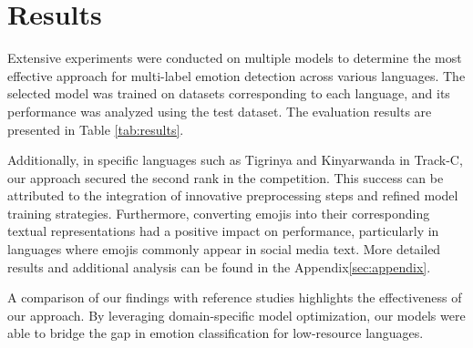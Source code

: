 \section{Results}
Extensive experiments were conducted on multiple models to determine the most effective approach for multi-label emotion detection across various languages. The selected model was trained on datasets corresponding to each language, and its performance was analyzed using the test dataset. The evaluation results are presented in Table \ref{tab:results}.

Additionally, in specific languages such as Tigrinya and Kinyarwanda in Track-C, our approach secured the second rank in the competition. This success can be attributed to the integration of innovative preprocessing steps and refined model training strategies. Furthermore, converting emojis into their corresponding textual representations had a positive impact on performance, particularly in languages where emojis commonly appear in social media text. More detailed results and additional analysis can be found in the Appendix\ref{sec:appendix}.

A comparison of our findings with reference studies \cite{muhammad2025brighterbridginggaphumanannotated} highlights the effectiveness of our approach. By leveraging domain-specific model optimization, our models were able to bridge the gap in emotion classification for low-resource languages.

